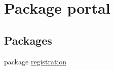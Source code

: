 \hypertarget{namespaceportal}{
\section{Package portal}
\label{namespaceportal}
}
\subsection*{Packages}
\begin{DoxyCompactItemize}
\item 
package \hyperlink{namespaceportal_1_1registration}{registration}
\end{DoxyCompactItemize}
